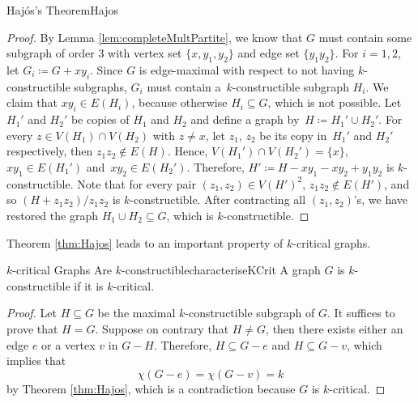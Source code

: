 \documentclass[math]{amznotes}
\theoremstyle{remark}
\newcommand{\0}{\mathbf{0}}
\newcommand{\1}{\mathbf{1}}
\begin{document}
\begin{thmbox}{Haj\'{o}s's Theorem}{Hajos}
\begin{proof}
        By Lemma \ref{lem:completeMultPartite}, we know that $G$ must contain some subgraph of order $3$ with vertex set $\{x, y_1, y_2\}$ and edge set $\{y_1y_2\}$. For $i = 1, 2$, let $G_i \coloneqq G + xy_i$. Since $G$ is edge-maximal with respect to not having $k$-constructible subgraphs, $G_i$ must contain a~$k$-constructible subgraph $H_i$. We claim that $xy_i \in E(H_i)$, because otherwise $H_i \subseteq G$, which is not possible. Let $H_1'$ and $H_2'$ be copies of $H_1$ and $H_2$ and define a graph by~$H \coloneqq H_1' \cup H_2'$. For every $z \in V(H_1) \cap V(H_2)$ with $z \neq x$, let $z_1$, $z_2$ be its copy in~$H_1'$ and $H_2'$ respectively, then $z_1z_2 \notin E(H)$. Hence, $V(H_1') \cap V(H_2') = \{x\}$, $xy_1 \in E(H_1')$ and~$xy_2 \in E(H_2')$. Therefore, $H' \coloneqq H - xy_1 - xy_2 + y_1y_2$ is $k$-constructible. Note that for every pair $(z_1, z_2) \in V(H')^2$, $z_1z_2 \notin E(H')$, and so $(H + z_1z_2)/z_1z_2$ is $k$-constructible. After contracting all $(z_1, z_2)$'s, we have restored the graph $H_1 \cup H_2 \subseteq G$, which is $k$-constructible.
    \end{proof}
\end{thmbox}
Theorem \ref{thm:Hajos} leads to an important property of $k$-critical graphs.
\begin{corbox}{$k$-critical Graphs Are $k$-constructible}{characteriseKCrit}
    A graph $G$ is $k$-constructible if it is $k$-critical. 
    \tcblower
    \begin{proof}
        Let $H \subseteq G$ be the maximal $k$-constructible subgraph of $G$. It suffices to prove that $H = G$. Suppose on contrary that $H \neq G$, then there exists either an edge $e$ or a vertex $v$ in $G - H$. Therefore, $H \subseteq G - e$ and $H \subseteq G - v$, which implies that 
        \begin{equation*}
            \chi(G - e) = \chi(G - v) = k
        \end{equation*}
        by Theorem \ref{thm:Hajos}, which is a contradiction because $G$ is $k$-critical.
    \end{proof}
\end{corbox}
\end{document}
